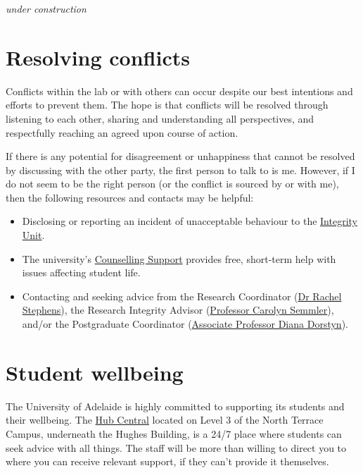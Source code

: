 \documentclass[
]{book}
\providecommand{\tightlist}{%
  \setlength{\itemsep}{0pt}\setlength{\parskip}{0pt}}
\begin{document}
\emph{under construction}

\hypertarget{conflicts}{%
\section{Resolving conflicts}\label{conflicts}}

Conflicts within the lab or with others can occur despite our best intentions and efforts to prevent them. The hope is that conflicts will be resolved through listening to each other, sharing and understanding all perspectives, and respectfully reaching an agreed upon course of action.

If there is any potential for disagreement or unhappiness that cannot be resolved by discussing with the other party, the first person to talk to is me. However, if I do not seem to be the right person (or the conflict is sourced by or with me), then the following resources and contacts may be helpful:

\begin{itemize}
\tightlist
\item
  Disclosing or reporting an incident of unacceptable behaviour to the \href{https://www.adelaide.edu.au/safer-campus-community/reporting-options}{Integrity Unit}.
\item
  The university's \href{https://www.adelaide.edu.au/counselling/}{Counselling Support} provides free, short-term help with issues affecting student life.
\item
  Contacting and seeking advice from the Research Coordinator (\href{https://researchers.adelaide.edu.au/profile/rachel.stephens}{Dr Rachel Stephens}), the Research Integrity Advisor (\href{https://researchers.adelaide.edu.au/profile/carolyn.semmler}{Professor Carolyn Semmler}), and/or the Postgraduate Coordinator (\href{https://www.adelaide.edu.au/directory/diana.dorstyn}{Associate Professor Diana Dorstyn}).
\end{itemize}

\hypertarget{student-wellbeing}{%
\section{Student wellbeing}\label{student-wellbeing}}

The University of Adelaide is highly committed to supporting its students and their wellbeing. The \href{https://www.adelaide.edu.au/student-hubs/hub-central}{Hub Central} located on Level 3 of the North Terrace Campus, underneath the Hughes Building, is a 24/7 place where students can seek advice with all things. The staff will be more than willing to direct you to where you can receive relevant support, if they can't provide it themselves.
\end{document}
